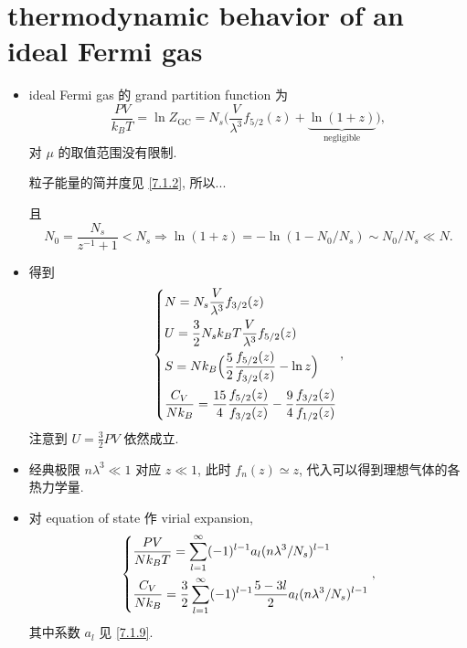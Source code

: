 \section{thermodynamic behavior of an ideal Fermi gas}
\begin{itemize}
	\item ideal Fermi gas 的 grand partition function 为
	\begin{equation}
		\frac{P V}{k_B T} = \ln Z_\text{GC} = N_s \Big( \frac{V}{\lambda^3} f_{5 / 2}(z) + \underbrace{\ln(1 + z)}_{\text{negligible}} \Big),
	\end{equation}
	对 $\mu$ 的取值范围没有限制.
	
	\begin{tcolorbox}[title=calculation:]
		粒子能量的简并度见 \eqref{7.1.2}, 所以...
		
		且
		\begin{equation}
			N_0 = \frac{N_s}{z^{- 1} + 1} < N_s \Longrightarrow \ln(1 + z) = - \ln(1 - N_0 / N_s) \sim N_0 / N_s \ll N.
		\end{equation}
	\end{tcolorbox}
	
	\item 得到
	\begin{equation}
		\begin{dcases}
			N = N_s \frac{V}{\lambda^3} f_{3 / 2}(z) \\
			U = \frac{3}{2} N_s k_B T \frac{V}{\lambda^3} f_{5 / 2}(z) \\
			S = N k_B \Big( \frac{5}{2} \frac{f_{5 / 2}(z)}{f_{3 / 2}(z)} - \ln z \Big) \\
			\frac{C_V}{N k_B} = \frac{15}{4} \frac{f_{5 / 2}(z)}{f_{3 / 2}(z)} - \frac{9}{4} \frac{f_{3 / 2}(z)}{f_{1 / 2}(z)}
		\end{dcases},
	\end{equation}
	注意到 $U = \frac{3}{2} P V$ 依然成立.
	
	\item 经典极限 $n \lambda^3 \ll 1$ 对应 $z \ll 1$, 此时 $f_n(z) \simeq z$, 代入可以得到理想气体的各热力学量.
	
	\item 对 equation of state 作 virial expansion,
	\begin{equation}
		\begin{dcases}
			\frac{P V}{N k_B T} = \sum_{l = 1}^\infty (- 1)^{l - 1} a_l (n \lambda^3 / N_s)^{l - 1} \\
			\frac{C_V}{N k_B} = \frac{3}{2} \sum_{l = 1}^\infty (- 1)^{l - 1} \frac{5 - 3 l}{2} a_l (n \lambda^3 / N_s)^{l - 1}
		\end{dcases},
	\end{equation}
	其中系数 $a_l$ 见 \eqref{7.1.9}.
\end{itemize}
